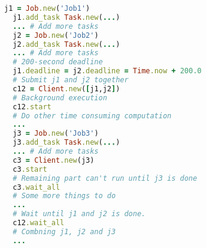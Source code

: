 \begin{lstlisting}[language=Ruby]
  j1 = Job.new('Job1')
  j1.add_task Task.new(...)
  ... # Add more tasks
  j2 = Job.new('Job2')
  j2.add_task Task.new(...)
  ... # Add more tasks
  # 200-second deadline
  j1.deadline = j2.deadline = Time.now + 200.0
  # Submit j1 and j2 together
  c12 = Client.new([j1,j2])
  # Background execution
  c12.start
  # Do other time consuming computation
  ...
  j3 = Job.new('Job3')
  j3.add_task Task.new(...)
  ... # Add more tasks
  c3 = Client.new(j3)
  c3.start
  # Remaining part can't run until j3 is done
  c3.wait_all
  # Some more things to do
  ...
  # Wait until j1 and j2 is done.
  c12.wait_all
  # Combning j1, j2 and j3
  ...
\end{lstlisting}

